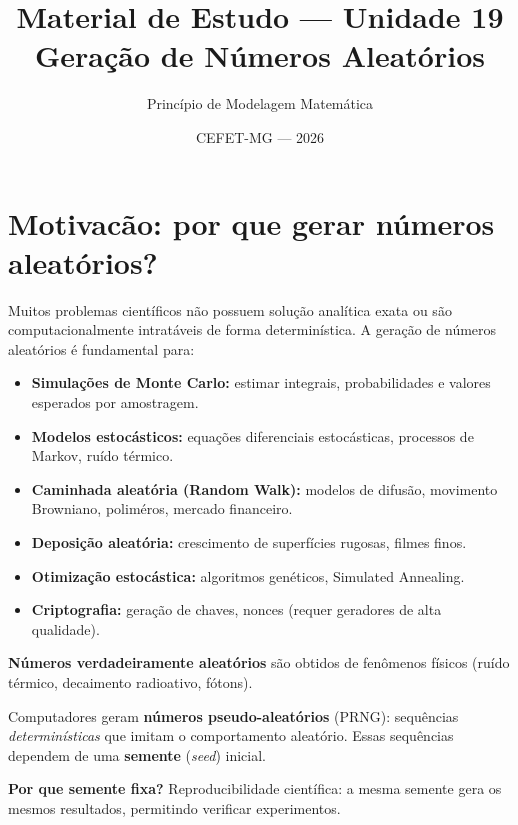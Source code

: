 \documentclass[12pt,a4paper]{article}
\title{\textbf{Material de Estudo --- Unidade 19}\\[0.4em]
       \large Gera\c{c}\~ao de N\'umeros Aleat\'orios}
\author{Princ\'ipio de Modelagem Matem\'atica}
\date{CEFET-MG --- 2026}
\begin{document}
\maketitle
\tableofcontents
\newpage

\section{Motivac\~ao: por que gerar n\'umeros aleat\'orios?}

Muitos problemas cient\'ificos n\~ao possuem solu\c{c}\~ao anal\'itica exata ou s\~ao computacionalmente intrat\'aveis de forma determin\'istica. A gera\c{c}\~ao de n\'umeros aleat\'orios \'e fundamental para:

\begin{itemize}
  \item \textbf{Simula\c{c}\~oes de Monte Carlo:} estimar integrais, probabilidades e valores esperados por amostragem.
  \item \textbf{Modelos estoc\'asticos:} equa\c{c}\~oes diferenciais estoc\'asticas, processos de Markov, ru\'ido t\'ermico.
  \item \textbf{Caminhada aleat\'oria (Random Walk):} modelos de difus\~ao, movimento Browniano, polim\'eros, mercado financeiro.
  \item \textbf{Deposi\c{c}\~ao aleat\'oria:} crescimento de superf\'icies rugosas, filmes finos.
  \item \textbf{Otimiza\c{c}\~ao estoc\'astica:} algoritmos gen\'eticos, Simulated Annealing.
  \item \textbf{Criptografia:} gera\c{c}\~ao de chaves, nonces (requer geradores de alta qualidade).
\end{itemize}

\textbf{N\'umeros verdadeiramente aleat\'orios} s\~ao obtidos de fen\^omenos f\'isicos
(ru\'ido t\'ermico, decaimento radioativo, f\'otons).

Computadores geram \textbf{n\'umeros pseudo-aleat\'orios} (PRNG): sequ\^encias
\emph{determin\'isticas} que imitam o comportamento aleat\'orio.
Essas sequ\^encias dependem de uma \textbf{semente} (\emph{seed}) inicial.

\textbf{Por que semente fixa?} Reproducibilidade cient\'ifica: a mesma semente gera os mesmos resultados, permitindo verificar experimentos.

\end{document}
